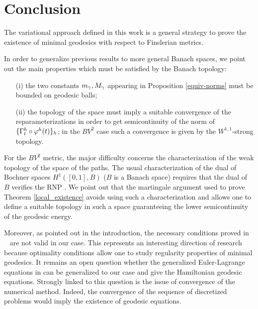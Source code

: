 
\section{Conclusion}

The variational approach defined in this work  is a general strategy to prove the existence of minimal geodesics with respect to Finslerian metrics. %

In order to generalize previous results to more general Banach spaces, we point out the main properties which must be satisfied by the Banach topology:

\begin{itemize}
\item[(i)] the two constants $m_\gamma, M_\gamma$ appearing in Proposition \ref{equiv-norms} must be bounded on geodesic balls;

\item[(ii)] the topology of the space must imply a suitable convergence of the reparameterizations in order to get semicontinuity of the norm of $\{\Gamma^{h}_t \circ \varphi^h(t) \}_h$; in the $BV^2$ case such a convergence is given by the  $W^{1,1}$-strong topology.
\end{itemize}

For the $BV^2$ metric, the major difficulty concerns the characterization of the weak topology of the space of the paths. The usual characterization of the dual of Bochner spaces $H^1([0,1],B)$ ($B$ is a Banach space) requires that the dual of $B$ verifies the RNP \cite{Bochner_dual, Bochner_dual_2}.
We point out that the martingale argument used to prove Theorem \ref{local_existence} avoids using such a characterization and allows one to define a suitable topology in such a space guaranteeing the lower semicontinuity of the geodesic energy.

Moreover, as pointed out in the introduction, the necessary conditions proved in ~\cite{Mord} are not valid in our case. This represents an interesting direction of research because optimality conditions allow one to study regularity properties of minimal geodesics. It remains an open question whether the generalized Euler-Lagrange equations in \cite{Mord} can be generalized to our case and give the Hamiltonian geodesic equations. Strongly linked to this question is the issue of convergence of the numerical method. Indeed, the convergence of the sequence of discretized problems would imply the existence of geodesic equations.

